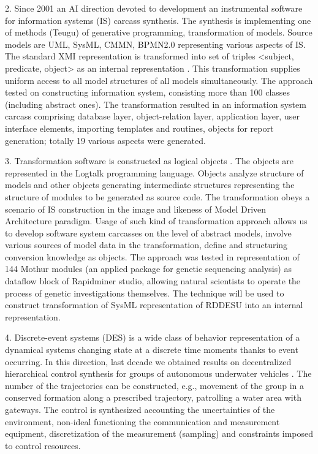 \documentclass[runningheads]{llncs}
\begin{document}
    2. Since 2001 an AI direction devoted to development an instrumental software for information systems (IS) carcass synthesis. The synthesis is implementing one of methods (Teugu) of generative programming, transformation of models. Source models are UML, SysML, CMMN, BPMN2.0 representing various aspects of IS. The standard XMI representation is transformed into set of triples <subject, predicate, object> as an internal representation \cite{b2}. This transformation supplies uniform access to all model structures of all models simultaneously. The approach tested on constructing information system, consisting more than 100 classes (including abstract ones). The transformation resulted in an information system carcass comprising database layer, object-relation layer, application layer, user interface elements, importing templates and routines, objects for report generation; totally 19 various aspects were generated.

    3. Transformation software is constructed as logical objects \cite{b3}. The objects are represented in the Logtalk programming language. Objects analyze structure of models and other objects generating intermediate structures representing the structure of modules to be generated as source code. The transformation obeys a scenario of IS construction in the image and likeness of Model Driven Architecture paradigm. Usage of such kind of transformation approach allows us to develop software system carcasses on the level of abstract models, involve various sources of model data in the transformation, define and structuring conversion knowledge as objects. The approach was tested in representation of 144 Mothur modules (an applied package for genetic sequencing analysis) as dataflow block of Rapidminer studio, allowing natural scientists to operate the process of genetic investigations themselves. The technique will be used to construct transformation of SysML representation of RDDESU into an internal representation.

    4. Discrete-event systems (DES) is a wide class of behavior representation of a dynamical systems changing state at a discrete time moments thanks to event occurring. In this direction, last decade we obtained results on decentralized hierarchical control synthesis for groups of autonomous underwater vehicles \cite{b4}. The number of the trajectories can be constructed, e.g., movement of the group in a conserved formation along a prescribed trajectory, patrolling a water area with gateways. The control is synthesized accounting the uncertainties of the environment, non-ideal functioning the communication and measurement equipment, discretization of the measurement (sampling) and constraints imposed to control resources.
\end{document}
